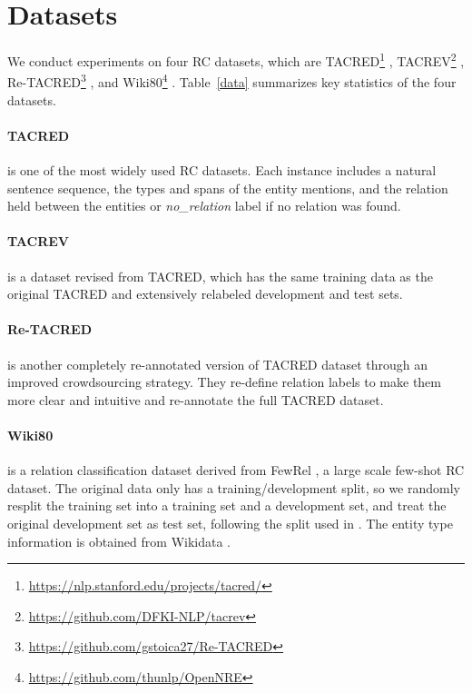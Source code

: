 \documentclass[11pt]{article}
\begin{document}



\appendix



\section{Datasets}\label{A}

We conduct experiments on four RC datasets, which are TACRED\footnote{\url{https://nlp.stanford.edu/projects/tacred/}} \cite{zhang-etal-2017-position}, TACREV\footnote{\url{https://github.com/DFKI-NLP/tacrev}} \cite{alt-etal-2020-tacred}, Re-TACRED\footnote{\url{https://github.com/gstoica27/Re-TACRED}} \cite{DBLP:conf/aaai/StoicaPP21}, and Wiki80\footnote{\url{https://github.com/thunlp/OpenNRE}} \cite{han-etal-2019-opennre}. Table~\ref{data} summarizes key statistics of the four datasets. 
\paragraph{TACRED} is one of the most widely used RC datasets. Each instance includes a natural sentence sequence, the types and spans of the entity mentions, and the relation held between the entities or  \textit{no\_relation} label if no relation was found.
\paragraph{TACREV} is a dataset revised from TACRED, which has the same training data as the original TACRED and extensively relabeled development and test sets. \paragraph{Re-TACRED} is another completely re-annotated version of TACRED dataset through an improved crowdsourcing strategy. They re-define relation labels to make them more clear and intuitive and re-annotate the full TACRED dataset.
\paragraph{Wiki80} is a relation classification dataset derived from FewRel \cite{han-etal-2018-fewrel}, a large scale few-shot RC dataset. The original data only has a training/development split, so we randomly resplit the training set into a training set and a development set, and treat the original development set as test set, following the split used in \citet{DBLP:journals/corr/abs-2104-07650}. The entity type information is obtained from Wikidata \cite{DBLP:journals/cacm/VrandecicK14}. 
\end{document}
